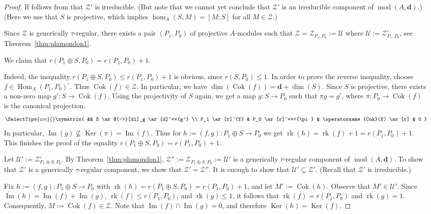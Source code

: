 \documentclass[12pt,reqno]{amsart}
\theoremstyle{definition}
\newcommand{\cZ}{{\mathcal Z}}
\newcommand{\bd}{\mathbf{d}}
\newcommand{\rk}{\operatorname{rk}}
\newcommand{\md}{\operatorname{mod}}
\newcommand{\dimv}{\underline{\dim}}
\newcommand{\Hom}{\operatorname{Hom}}
\newcommand{\Ima}{\operatorname{Im}}
\newcommand{\Ker}{\operatorname{Ker}}
\newcommand{\Coker}{\operatorname{Cok}}
\newcommand{\calU}{\mathcal{U}}
\newcommand{\calZ}{\mathcal{Z}}
\begin{document}
\begin{proof}
If follows from \cite[Section~2.1]{B94} that $\calZ'$ is irreducible.
(But note that we cannot yet conclude that $\calZ'$ is
an irreducible component of $\md(A,\bd)$.)
(Here we use that $S$ is projective, which implies
$\hom_A(S,M) = [M:S]$ for all $M \in \calZ$.)

Since $\calZ$ is generically $\tau$-regular,
there exists a pair $(P_1,P_0)$ of projective $A$-modules such that
$\calZ = \calZ_{P_1,P_0} :=  \overline{\calU}$ where
$\calU := \calZ_{P_1,P_0}^\circ$, see
Theorem~\ref{thm:plamondon1}.

We claim that $r(P_1 \oplus S,P_0) = r(P_1,P_0) + 1$.

Indeed, the inequality $r(P_1 \oplus S,P_0) \leq r(P_1,P_0) + 1$ is obvious, since $r(S,P_0) \leq 1$.
In order to prove the reverse inequality, choose
$f \in \Hom_A(P_1,P_0)^\circ$.
Thus
$\Coker(f) \in \calZ$.
In particular, we have
$\dimv(\Coker(f)) = \bd + \dimv(S)$.
Since $S$ is projective, there exists a non-zero map $g'\colon S \to \Coker(f)$.
Using the projectivity of $S$ again, we get a map $g\colon S \to P_0$ such that $\pi g = g'$,
where $\pi\colon P_0 \to \Coker(f)$ is the canonical projection.
$$
\SelectTips{cm}{}
\xymatrix{
&& S \ar@{-->}[dl]_g \ar[d]^<<<<{g'}
\\
P_1 \ar[r]^{f} & P_0 \ar[r]^<<<<<{\pi} & \Coker(f) \ar[r] & 0
}
$$
In particular, $\Ima(g) \not \subseteq \Ker(\pi) = \Ima(f)$.
Thus for $h := (f,g)\colon P_1 \oplus S \to P_0$ we get
$\rk(h) = \rk(f) + 1 = r(P_1,P_0) + 1$.
This finishes the proof of the equality $r(P_1 \oplus S,P_0) = r(P_1,P_0) + 1$.


Let $\calU' := \calZ_{P_1 \oplus S,P_0}^\circ$.
By Theorem~\ref{thm:plamondon1},
$\calZ'' := \cZ_{P_1 \oplus S,P_0} := \overline{\calU'}$
is a generically $\tau$-regular component of $\md(A,\bd)$.
To show that
$\calZ'$ is a generically $\tau$-regular component, we show that
$\calZ' = \calZ''$.
It is enough to show that $\calU' \subseteq \calZ'$. (Recall that $\calZ'$ is irreducible.)

Fix $h := (f,g)
\colon P_1 \oplus S \to P_0$ with $\rk(h) = r(P_1 \oplus S,P_0) =
r(P_1,P_0) + 1$, and let $M' := \Coker(h)$.
Observe that $M' \in \calU'$.
Since $\Ima(h) = \Ima(f) + \Ima(g)$, $\rk(f) \leq r(P_1,P_0)$, and
$\rk(g) \leq 1$, it follows that
$\rk(f) = r(P_1,P_0)$ and $\rk(g) = 1$.
Consequently, $M := \Coker(f) \in \calZ$.
Note that
$\Ima(f) \cap \Ima(g) = 0$, and therefore $\Ker(h) = \Ker(f)$.


\end{proof}
\end{document}
